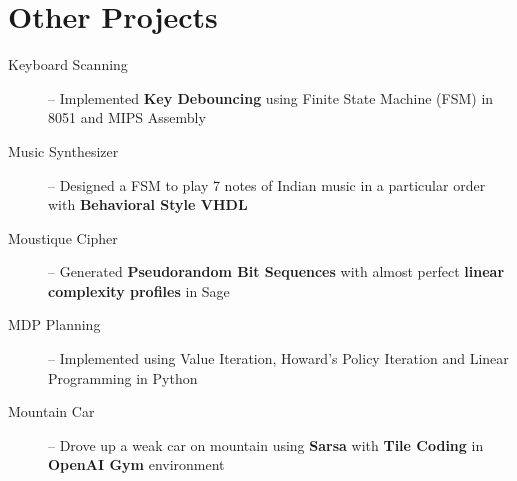 \documentclass[10pt,a4paper,sans]{moderncv}        %
\begin{document}
\section{Other Projects}
\begin{description}
\item[Keyboard Scanning] -- Implemented \textbf{Key Debouncing} using Finite State Machine (FSM) in 8051 and MIPS Assembly
\item[Music Synthesizer] -- Designed a FSM to play 7 notes of Indian music in a particular order with \textbf{Behavioral Style VHDL}%
\item[Moustique Cipher] -- Generated \textbf{Pseudorandom Bit Sequences} with almost perfect \textbf{linear complexity profiles} in Sage %
\item[MDP Planning] -- Implemented using Value Iteration, Howard's Policy Iteration and Linear Programming in {Python}
\item[Mountain Car] -- Drove up a weak car on mountain using \textbf{Sarsa} with \textbf{Tile Coding} in \textbf{OpenAI Gym} environment%
\end{description}
\end{document}

